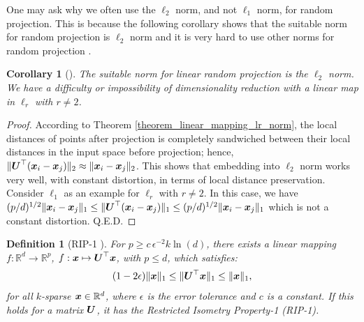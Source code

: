 \documentclass{article}
\newtheorem{corollary}{Corollary}
\newtheorem{definition}{Definition}
\def\b{\ensuremath\boldsymbol}
\begin{document}
One may ask why we often use the $\ell_2$ norm, and not $\ell_1$ norm, for random projection. This is because the following corollary shows that the suitable norm for random projection is $\ell_2$ norm and it is very hard to use other norms for random projection \cite{charikar2002dimension,brinkman2005impossibility}. 
\begin{corollary}[{\citep[Section 3]{lee2005metric}}]\label{corollary_impossible_l1_embedding}
The suitable norm for linear random projection is the $\ell_2$ norm. We have a difficulty or impossibility of dimensionality reduction with a linear map in $\ell_r$ with $r \neq 2$.
\end{corollary}
\begin{proof}
According to Theorem \ref{theorem_linear_mapping_lr_norm}, the local distances of points after projection is completely sandwiched between their local distances in the input space before projection; hence, $\|\b{U}^\top (\b{x}_i - \b{x}_j)\|_2 \approx \|\b{x}_i - \b{x}_j\|_2$. This shows that embedding into $\ell_2$ norm works very well, with constant distortion, in terms of local distance preservation. Consider $\ell_1$ as an example for $\ell_r$ with $r \neq 2$. In this case, we have $(p/d)^{1/2} \|\b{x}_i - \b{x}_j\|_1 \leq \|\b{U}^\top (\b{x}_i - \b{x}_j)\|_1 \leq (p/d)^{1/2} \|\b{x}_i - \b{x}_j\|_1$ which is not a constant distortion. Q.E.D.
\end{proof}

\begin{definition}[RIP-1 {\citep[Definition 8]{berinde2008combining}}]
For $p \geq c\, \epsilon^{-2} k \ln(d)$, there exists a linear mapping $f: \mathbb{R}^d \rightarrow \mathbb{R}^p$, $f: \b{x} \mapsto \b{U}^\top \b{x}$, with $p \leq d$, which satisfies:
\begin{align}
(1 - 2\epsilon) \|\b{x}\|_1 \leq \|\b{U}^\top \b{x}\|_1 \leq \|\b{x}\|_1,
\end{align}
for all $k$-sparse $\b{x} \in \mathbb{R}^d$, where $\epsilon$ is the error tolerance and $c$ is a constant. 
If this holds for a matrix $\b{U}$, it has the Restricted Isometry Property-1 (RIP-1).
\end{definition}
\end{document}
